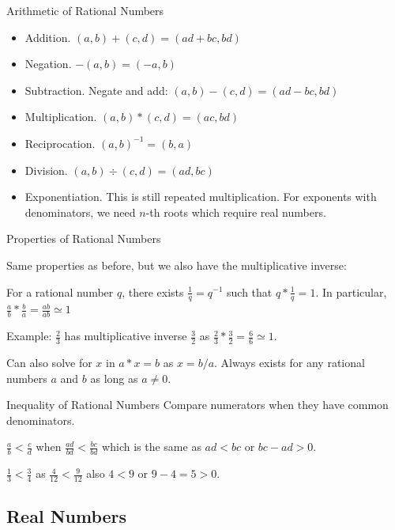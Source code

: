 \documentclass{beamer}
\begin{document}
\begin{frame}{Arithmetic of  Rational Numbers}


\begin{itemize}
\item Addition.  $(a,b) + (c,d) =  (ad+ bc, bd)$
\item Negation. $-(a,b) = (-a, b)$
\item Subtraction. Negate and add:  $(a,b) - (c,d) = (ad -bc, bd)$
\item Multiplication.  $(a,b)*(c,d) = (ac, bd)$
\item Reciprocation. $(a,b)^{-1} = (b, a)$
\item Division. $(a,b) \div (c,d) = (ad, bc)$
\item Exponentiation. This is still repeated multiplication. For exponents with denominators, we need $n$-th roots which require real numbers. 
\end{itemize} 

\end{frame}

\begin{frame}{Properties of Rational Numbers}

Same properties as before, but we also have the multiplicative inverse: 

For a rational number $q$, there exists $\frac{1}{q} = q^{-1}$ such that $q*\frac{1}{q} = 1$. In particular, $\frac{a}{b} * \frac{b}{a} = \frac{ab}{ab} \simeq 1$

Example: $\frac{2}{3}$ has multiplicative inverse $\frac{3}{2}$ as $\frac{2}{3} * \frac{3}{2} = \frac{6}{6} \simeq 1$.

Can also solve for $x$ in $a*x = b$ as $x = b/a$. Always exists for any rational numbers $a$ and $b$ as long as $a \neq 0$.

\end{frame}

\begin{frame}{Inequality of Rational Numbers}
    Compare numerators when they have common denominators. 

    $\frac{a}{b} < \frac{c}{d}$ when $\frac{ad}{bd} < \frac{bc}{bd}$ which is the same as $ad < bc$ or $bc-ad > 0$.

    $\frac{1}{3} < \frac{3}{4}$ as $\frac{4}{12}< \frac{9}{12}$ also $4 < 9$ or $9-4 = 5 > 0$.

\end{frame}


\subsection{Real Numbers}
\end{document}
